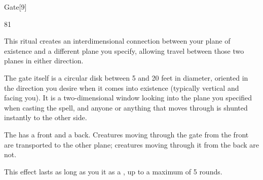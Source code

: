 \begin{spellsection}{Gate}[9]

\begin{spellcontent}

\begin{spelltargetinginfo}


 81
\end{spelltargetinginfo}


\begin{spelleffects}



\spelleffect
This ritual creates an interdimensional connection between your plane of existence and a different plane you specify, allowing travel between those two planes in either direction.

The gate itself is a circular disk between 5 and 20 feet in diameter, oriented in the direction you desire when it comes into existence (typically vertical and facing you).
It is a two-dimensional window looking into the plane you specified when casting the spell, and anyone or anything that moves through is shunted instantly to the other side.

The  has a front and a back. Creatures moving through the gate from the front are transported to the other plane; creatures moving through it from the back are not.


This effect lasts as long as you  it as a , up to a maximum of 5 rounds.








\end{spelleffects}

\end{spellcontent}
\begin{spellfooter}


\end{spellfooter}
\begin{spellsubcontent}


\end{spellsubcontent}
\end{spellsection}


